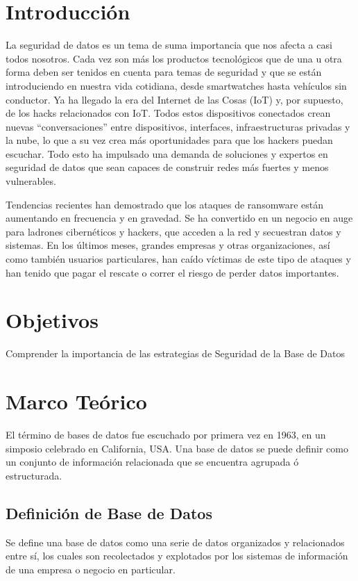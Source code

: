 \section{Introducción}

La seguridad de datos es un tema de suma importancia que nos afecta a casi todos nosotros. Cada vez son más los productos tecnológicos que de una u otra forma deben ser tenidos en cuenta para temas de seguridad y que se están introduciendo en nuestra vida cotidiana, desde smartwatches hasta vehículos sin conductor. Ya ha llegado la era del Internet de las Cosas (IoT) y, por supuesto, de los hacks relacionados con IoT. Todos estos dispositivos conectados crean nuevas “conversaciones” entre dispositivos, interfaces, infraestructuras privadas y la nube, lo que a su vez crea más oportunidades para que los hackers puedan escuchar. Todo esto ha impulsado una demanda de soluciones y expertos en seguridad de datos que sean capaces de construir redes más fuertes y menos vulnerables.

Tendencias recientes han demostrado que los ataques de ransomware están aumentando en frecuencia y en gravedad. Se ha convertido en un negocio en auge para ladrones cibernéticos y hackers, que acceden a la red y secuestran datos y sistemas. En los últimos meses, grandes empresas y otras organizaciones, así como también usuarios particulares, han caído víctimas de este tipo de ataques y han tenido que pagar el rescate o correr el riesgo de perder datos importantes.


\section{Objetivos}
Comprender la importancia de las estrategias de Seguridad de la Base de Datos



\section{Marco Teórico}
El término de bases de datos fue escuchado por primera vez en 1963, en un simposio celebrado en California, USA. Una base de datos se puede definir como un conjunto de información relacionada que se encuentra agrupada ó estructurada.

\subsection{Definición de Base de Datos}
Se define una base de datos como una serie de datos organizados y relacionados entre sí, los cuales son recolectados y explotados por los sistemas de información de una empresa o negocio en particular.

